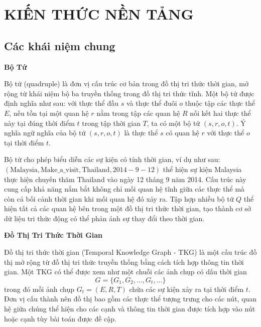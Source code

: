 \chapter{KIẾN THỨC NỀN TẢNG}
\label{Chapter3}


\section{Các khái niệm chung}

\textbf{Bộ Tứ}

Bộ tứ (quadruple) là đơn vị cấu trúc cơ bản trong đồ thị tri thức thời gian, mở rộng từ khái niệm bộ ba truyền thống trong đồ thị tri thức tĩnh. Một bộ tứ được định nghĩa như sau: với thực thể đầu $s$ và thực thể đuôi $o$ thuộc tập các thực thể $E$, nếu tồn tại một quan hệ $r$ nằm trong tập các quan hệ $R$ nối kết hai thực thể này tại đúng thời điểm $t$ trong tập thời gian $T$, ta có một bộ tứ $(s, r, o, t)$. Ý nghĩa ngữ nghĩa của bộ tứ $(s, r, o, t)$ là thực thể $s$ có quan hệ $r$ với thực thể $o$ tại thời điểm $t$.

Bộ tứ cho phép biểu diễn các sự kiện có tính thời gian, ví dụ như sau: $(\text{Malaysia}, \text{Make\_a\_visit}, \text{Thailand}, 2014-9-12)$ thể hiện sự kiện Malaysia thực hiện chuyến thăm Thailand vào ngày 12 tháng 9 năm 2014. Cấu trúc này cung cấp khả năng nắm bắt không chỉ mối quan hệ tĩnh giữa các thực thể mà còn cả bối cảnh thời gian khi mối quan hệ đó xảy ra. Tập hợp nhiều bộ tứ $Q$ thể hiện tất cả các quan hệ bên trong một đồ thị tri thức thời gian, tạo thành cơ sở dữ liệu tri thức động có thể phản ánh sự thay đổi theo thời gian.

\vspace{1em}
\textbf{Đồ Thị Tri Thức Thời Gian}

Đồ thị tri thức thời gian (Temporal Knowledge Graph - TKG) là một cấu trúc đồ thị mở rộng từ đồ thị tri thức truyền thống bằng cách tích hợp thông tin thời gian. Một TKG có thể được xem như một chuỗi các ảnh chụp có dấu thời gian 
\[
G = \{G_1, G_2, ..., G_t, ...\}
\]
trong đó mỗi ảnh chụp $G_t = (E, R, T)$ chứa các sự kiện xảy ra tại thời điểm $t$. Đơn vị cấu thành nên đồ thị bao gồm các thực thể tượng trưng cho các nút, quan hệ giữa chúng thể hiện cho các cạnh và thông tin thời gian được tích hợp vào nút hoặc cạnh tùy bài toán được đề cập.

